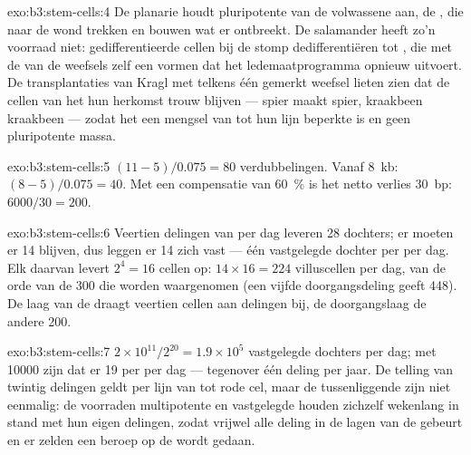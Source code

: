 \begin{solution}{exo:b3:stem-cells:4}
De planarie houdt pluripotente  van de volwassene aan, de
, die naar de wond trekken en bouwen wat er ontbreekt. De
salamander heeft zo'n voorraad niet: gedifferentieerde cellen bij de
stomp dedifferentiëren tot , die met de  van de
weefsels zelf een  vormen dat het ledemaatprogramma opnieuw
uitvoert. De transplantaties van Kragl met telkens één gemerkt weefsel
lieten zien dat de cellen van het  hun herkomst trouw blijven
--- spier maakt spier, kraakbeen kraakbeen --- zodat het  een
mengsel van tot hun lijn beperkte  is en geen
pluripotente massa.
\end{solution}

\begin{solution}{exo:b3:stem-cells:5}
$(11 - 5)/0.075 = 80$ verdubbelingen. Vanaf \qty{8}{kb}:
$(8 - 5)/0.075 = 40$. Met een compensatie van \qty{60}{\%} is het netto
verlies \qty{30}{bp}: $6000/30
= 200$.
\end{solution}

\begin{solution}{exo:b3:stem-cells:6}
Veertien delingen van  per dag leveren 28 dochters; er moeten
er 14  blijven, dus leggen er 14 zich vast --- één vastgelegde
dochter per  per dag. Elk daarvan levert $2^{4} = 16$ cellen op:
$14\times 16 = 224$ villuscellen per dag, van de orde van de \num{300}
die worden waargenomen (een vijfde doorgangsdeling geeft \num{448}). De
laag van de  draagt veertien cellen aan delingen bij, de
doorgangslaag de andere \num{200}.
\end{solution}

\begin{solution}{exo:b3:stem-cells:7}
$2\times 10^{11}/2^{20} = 1.9\times 10^{5}$ vastgelegde dochters per
dag; met \num{10000}  zijn dat er 19 per  per dag ---
tegenover één deling per jaar. De telling van twintig delingen geldt per
lijn van  tot rode cel, maar de tussenliggende 
zijn niet eenmalig: de voorraden multipotente en vastgelegde
 houden zichzelf wekenlang in stand met hun eigen
delingen, zodat vrijwel alle deling in de lagen van de 
gebeurt en er zelden een beroep op de  wordt gedaan.
\end{solution}


